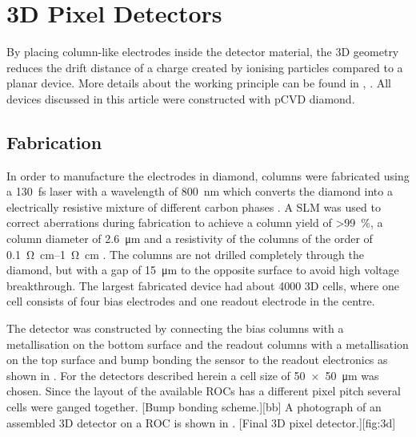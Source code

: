 \section{3D Pixel Detectors}
By placing column-like electrodes inside the detector material, the 3D geometry reduces the drift distance of a charge created by ionising particles compared to a planar device. More details about the working principle can be found in \cite{parker}, \cite{3D}. All devices discussed in this article were constructed with \ac{pCVD} diamond.
\subsection{Fabrication}
In order to manufacture the electrodes in diamond, columns were fabricated using a \SI{130}{\femto\second} laser with a wavelength of \SI{800}{\nano\meter} which converts the diamond into a electrically resistive mixture of different carbon phases \cite{3dfab}. A \ac{SLM} was used to correct aberrations during fabrication to achieve a column yield of \SI{>99}{\%}, a column diameter of \SI{2.6}{\micro\meter} and a resistivity of the columns of the order of \SIrange{.1}{1}{\ohm\centi\meter} \cite{slm}. The columns are not drilled completely through the diamond, but with a gap of \SI{15}{\micro\meter} to the opposite surface to avoid high voltage breakthrough. The largest fabricated device had about 4000 3D cells, where one cell consists of four bias electrodes and one readout electrode in the centre. \par
The detector was constructed by connecting the bias columns with a metallisation on the bottom surface and the readout columns with a metallisation on the top surface and bump bonding the sensor to the readout electronics as shown in . For the detectors described herein a cell size of \SI{50x50}{\micro\meter} was chosen. Since the layout of the available \acp{ROC} has a different pixel pitch several cells were ganged together.
[Bump bonding scheme.][bb]
A photograph of an assembled 3D detector on a \ac{ROC} is shown in .
[Final 3D pixel detector.][fig:3d]
